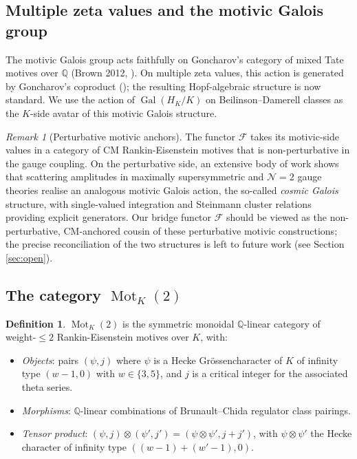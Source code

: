 \documentclass[11pt]{amsart}
\theoremstyle{definition}
\newtheorem{definition}[theorem]{Definition}
\theoremstyle{remark}
\newtheorem{remark}[theorem]{Remark}
\DeclareMathOperator{\Gal}{Gal}
\DeclareMathOperator{\Mot}{Mot}
\newcommand{\Q}{\mathbb{Q}}
\newcommand{\HK}{H_K}
\begin{document}
\subsection{Multiple zeta values and the motivic Galois group}\label{ss:mzv}

The motivic Galois group acts faithfully on Goncharov's category of
mixed Tate motives over $\Q$ (Brown 2012, \cite{Brown2012}). On
multiple zeta values, this action is generated by Goncharov's
coproduct (\cite{Goncharov2001}); the resulting Hopf-algebraic structure
is now standard. We use the action of $\Gal(\HK/K)$ on Beilinson--Damerell
classes as the $K$-side avatar of this motivic Galois structure.

\begin{remark}[Perturbative motivic anchors]\label{rk:perturbative-motivic}
The functor $\mathcal{F}$ takes its motivic-side values in a category
of CM Rankin-Eisenstein motives that is non-perturbative in the gauge
coupling. On the perturbative side, an extensive body of work
\cite{Brown2016CosmicGalois, BrownDupont2019, CaronHuotDixon2020}
shows that scattering amplitudes in maximally supersymmetric and
$\mathcal{N}=2$ gauge theories realise an analogous motivic Galois
action, the so-called \emph{cosmic Galois} structure, with
single-valued integration and Steinmann cluster relations providing
explicit generators. Our bridge functor $\mathcal{F}$ should be
viewed as the non-perturbative, CM-anchored cousin of these
perturbative motivic constructions; the precise reconciliation of
the two structures is left to future work (see Section
\ref{sec:open}).
\end{remark}

\subsection{The category $\Mot_K(2)$}\label{ss:Mot-K}

\begin{definition}\label{def:Mot-K}
$\Mot_K(2)$ is the symmetric monoidal $\Q$-linear category of weight-$\le 2$
Rankin-Eisenstein motives over $K$, with:
\begin{itemize}
\item \emph{Objects}: pairs $(\psi, j)$ where $\psi$ is a Hecke
Gr\"ossencharacter of $K$ of infinity type $(w-1, 0)$ with $w \in \{3, 5\}$,
and $j$ is a critical integer for the associated theta series.
\item \emph{Morphisms}: $\Q$-linear combinations of Brunault--Chida regulator
class pairings.
\item \emph{Tensor product}: $(\psi, j) \otimes (\psi', j') = (\psi \otimes \psi',
j + j')$, with $\psi \otimes \psi'$ the Hecke character of infinity type
$((w-1) + (w'-1), 0)$.
\end{itemize}
\end{definition}
\end{document}
